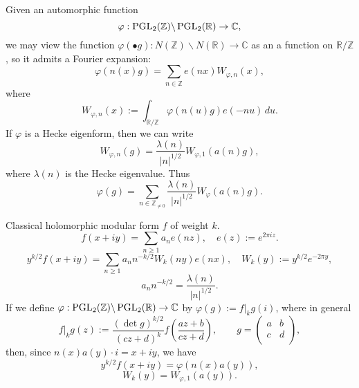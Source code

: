 \documentclass[reqno]{amsart} 
\begin{document}
Given an automorphic function
\begin{equation*}
  \varphi : \operatorname{PGL}_2(\mathbb{Z}) \backslash \operatorname{PGL}_2(\mathbb{R}) \rightarrow \mathbb{C},
\end{equation*}
we may view the function $\varphi(\bullet g) : N(\mathbb{Z}) \backslash N(\mathbb{R}) \rightarrow \mathbb{C}$ as an a function on $\mathbb{R} / \mathbb{Z}$, so it admits a Fourier expansion:
\begin{equation*}
  \varphi(n(x) g)
  =
  \sum_{n \in \mathbb{Z}}
  e(n x)
  W_{\varphi, n}(x),
\end{equation*}
where
\begin{equation*}
  W_{\varphi, n}(x) := 
  \int_{\mathbb{R} / \mathbb{Z}}
  \varphi(n(u) g) e(- n u) \, d u.    
\end{equation*}
If $\varphi$ is a Hecke eigenform, then we can write
\begin{equation}\label{eq:cqy4x9qh1q}
  W_{\varphi, n}(g) = \frac{\lambda(n)}{\lvert n \rvert^{1/2}} W_{\varphi, 1}(a(n) g),
\end{equation}
where $\lambda(n)$ is the Hecke eigenvalue.  Thus
\begin{equation}\label{eq:cqy4x9r574}
  \varphi(g) = \sum_{n \in \mathbb{Z}_{\neq 0}} \frac{\lambda(n)}{\lvert n \rvert^{1/2}}
  W_\varphi(a(n) g).
\end{equation}


\begin{example}\label{example:cqy4x9qvf5}
  Classical holomorphic modular form $f$ of weight $k$.
  \begin{equation*}
    f(x + i y) = \sum_{n \geq 1} a_n e(n z), \quad e(z) := e^{2 \pi i z}.
  \end{equation*}
  \begin{equation*}
    y^{k/2} f(x + i y) = \sum_{n \geq 1} a_n n^{- k/2} W_k(n y) e(n x),
    \quad
    W_k(y) := y^{k /2} e^{- 2 \pi y},
  \end{equation*}
  \begin{equation*}
    a_n n^{- k/2} = \frac{\lambda (n)}{\lvert n \rvert^{1/2}}.    
  \end{equation*}
  If we define $\varphi : \operatorname{PGL}_2(\mathbb{Z}) \backslash \operatorname{PGL}_2(\mathbb{R}) \rightarrow \mathbb{C}$ by $\varphi(g) := f|_k g(i)$, where in general
  \begin{equation*}
    f |_k g(z) :=
    \frac{(\det g)^{k/2}}{(c z + d)^k} f\left( \frac{a z + b}{c z + d} \right),
    \qquad g
    =
    \begin{pmatrix}
      a      & b \\
      c & d \\
    \end{pmatrix},
  \end{equation*}
  then, since $n(x) a(y) \cdot i = x + i y$, we have
  \begin{equation*}
    y^{k / 2} f(x + i y) = \varphi(n(x) a(y)),
  \end{equation*}
  \begin{equation*}
    W_k(y) = W_{\varphi, 1}(a(y)).
  \end{equation*}
\end{example}
\end{document}
